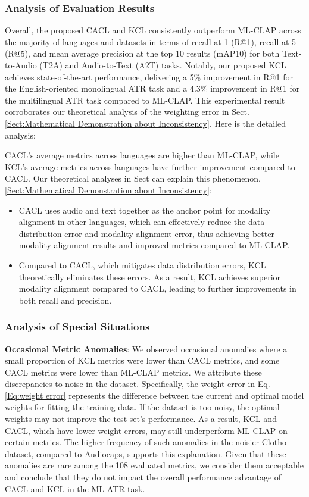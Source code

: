 \subsubsection{Analysis of Evaluation Results}
Overall, the proposed CACL and KCL consistently outperform ML-CLAP across the majority of languages and datasets in terms of recall at 1 (R@1), recall at 5 (R@5), and mean average precision at the top 10 results (mAP10) for both Text-to-Audio (T2A) and Audio-to-Text (A2T) tasks. Notably, our proposed KCL achieves state-of-the-art performance, delivering a 5\% improvement in R@1 for the English-oriented monolingual ATR task and a 4.3\% improvement in R@1 for the multilingual ATR task compared to ML-CLAP. This experimental result corroborates our theoretical analysis of the weighting error in Sect. \ref{Sect:Mathematical Demonstration about Inconsistency}. Here is the detailed analysis:

CACL's average metrics across languages are higher than ML-CLAP, while KCL's average metrics across languages have further improvement compared to CACL. Our theoretical analyses in Sect can explain this phenomenon. \ref{Sect:Mathematical Demonstration about Inconsistency}:
\begin{itemize}
    \item CACL uses audio and text together as the anchor point for modality alignment in other languages, which can effectively reduce the data distribution error and modality alignment error, thus achieving better modality alignment results and improved metrics compared to ML-CLAP.
    \item Compared to CACL, which mitigates data distribution errors, KCL theoretically eliminates these errors. As a result, KCL achieves superior modality alignment compared to CACL, leading to further improvements in both recall and precision.
\end{itemize}


\subsubsection{Analysis of Special Situations}

\textbf{Occasional Metric Anomalies}: We observed occasional anomalies where a small proportion of KCL metrics were lower than CACL metrics, and some CACL metrics were lower than ML-CLAP metrics. We attribute these discrepancies to noise in the dataset. Specifically, the weight error in Eq. \eqref{Eq:weight error} represents the difference between the current and optimal model weights for fitting the training data. If the dataset is too noisy, the optimal weights may not improve the test set's performance. As a result, KCL and CACL, which have lower weight errors, may still underperform ML-CLAP on certain metrics. The higher frequency of such anomalies in the noisier Clotho dataset, compared to Audiocaps, supports this explanation. Given that these anomalies are rare among the 108 evaluated metrics, we consider them acceptable and conclude that they do not impact the overall performance advantage of CACL and KCL in the ML-ATR task.

